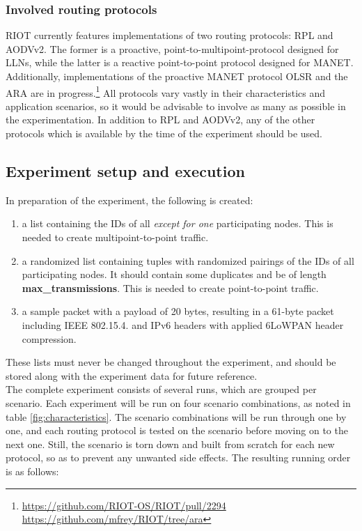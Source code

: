 \documentclass{acm_proc_article-sp}
\begin{document}
\subsubsection{Involved routing protocols}
\label{subsec:protocols}
RIOT currently features implementations of two routing protocols: RPL\cite{RFC-6550} and AODVv2\cite{draft-ietf-manet-aodvv2-09}. The former is a proactive, point-to-multipoint-protocol designed for \glspl{LLN}, while the latter is a reactive point-to-point protocol designed for \gls{MANET}. Additionally, implementations of the proactive \gls{MANET} protocol OLSR\cite{RFC-3626} and the \gls{ARA}\cite{ara} are in progress.\footnote{ \url{https://github.com/RIOT-OS/RIOT/pull/2294}\\  \url{https://github.com/mfrey/RIOT/tree/ara}}
All protocols vary vastly in their characteristics and application scenarios, so it would be advisable to involve as many as possible in the experimentation. In addition to RPL and AODVv2, any of the other protocols which is available by the time of the experiment should be used.

\subsection{Experiment setup and execution}
\label{subsec:setup}
In preparation of the experiment, the following is created:
\begin{enumerate}
\item a list containing the IDs of all \emph{except for one} participating nodes. This is needed to create multipoint-to-point traffic.
\item a randomized list containing tuples with randomized pairings of the IDs of all participating nodes. It should contain some duplicates and be of length \textbf{max\_transmissions}. This is needed to create point-to-point traffic.
\item a sample packet with a payload of 20 bytes, resulting in a 61-byte packet including IEEE 802.15.4. and IPv6 headers with applied 6LoWPAN header compression.
\end{enumerate}
These lists must never be changed throughout the experiment, and should be stored along with the experiment data for future reference.\\

The complete experiment consists of several runs, which are grouped per scenario.
Each experiment will be run on four scenario combinations, as noted in table \ref{fig:characteristics}. The scenario combinations will be run through one by one, and each routing protocol is tested on the scenario before moving on to the next one. Still, the scenario is torn down and built from scratch for each new protocol, so as to prevent any unwanted side effects. The resulting running order is as follows:
\end{document}
